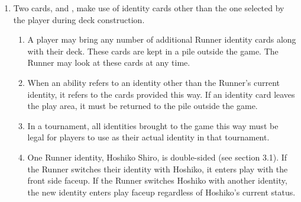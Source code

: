 \begin{enumerate}
\begin{enumerate}
	      \end{enumerate}
	\item Two cards,  and , make use of identity cards other than the one selected by the player during deck construction.
	      \begin{enumerate}
		      \item A player may bring any number of additional Runner identity cards along with their deck. These cards are kept in a pile outside the game. The Runner may look at these cards at any time.
		      \item When an ability refers to an identity other than the Runner's current identity, it refers to the cards provided this way. If an identity card leaves the play area, it must be
		            returned to the pile outside the game.
		      \item In a tournament, all identities brought to the game this way must be legal for players to use as their actual identity in that tournament.
		      \item \textcolor{Bittersweet}{One Runner identity, Hoshiko Shiro, is double-sided (see section 3.1). If the Runner switches their identity with Hoshiko, it enters play with the front side faceup. If the Runner switches Hoshiko with another identity, the new identity enters play faceup regardless of Hoshiko’s current status.}
	      \end{enumerate}
\end{enumerate}
\clearpage
